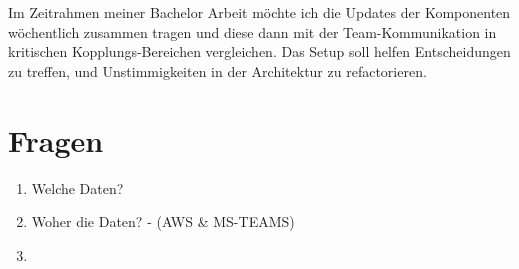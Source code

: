 \documentclass[12pt,reqno]{amsart}
\begin{document}
\bigskip

Im Zeitrahmen meiner Bachelor Arbeit möchte ich die Updates der Komponenten \\ wöchentlich zusammen tragen und diese dann mit der Team-Kommunikation in kritischen Kopplungs-Bereichen vergleichen. 
Das Setup soll helfen Entscheidungen zu treffen, und Unstimmigkeiten in der Architektur zu refactorieren.


\bigskip

\section{Fragen}

\medskip

\begin{enumerate}

\item Welche Daten?
\item Woher die Daten? - (AWS \& MS-TEAMS)
\item 


\end{enumerate}
\end{document}

